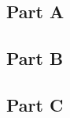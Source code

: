 \documentclass{article}
\begin{document}
\subsection*{Part A}
\subsection*{Part B}
\subsection*{Part C}
\end{document}
